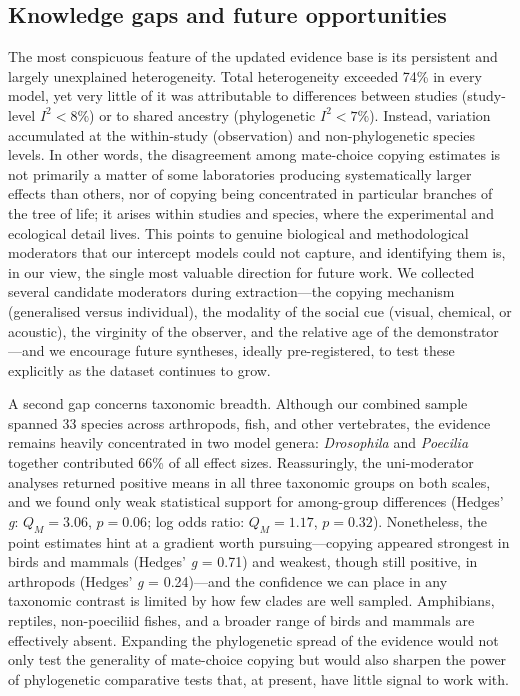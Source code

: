 \subsection{Knowledge gaps and future opportunities}

The most conspicuous feature of the updated evidence base is its persistent and
largely unexplained heterogeneity. Total heterogeneity exceeded 74\% in every
model, yet very little of it was attributable to differences between studies
(study-level $I^2 < 8\%$) or to shared ancestry (phylogenetic $I^2 < 7\%$).
Instead, variation accumulated at the within-study (observation) and
non-phylogenetic species levels. In other words, the disagreement among
mate-choice copying estimates is not primarily a matter of some laboratories
producing systematically larger effects than others, nor of copying being
concentrated in particular branches of the tree of life; it arises within
studies and species, where the experimental and ecological detail lives. This
points to genuine biological and methodological moderators that our intercept
models could not capture, and identifying them is, in our view, the single most
valuable direction for future work. We collected several candidate moderators
during extraction---the copying mechanism (generalised versus individual), the
modality of the social cue (visual, chemical, or acoustic), the virginity of the
observer, and the relative age of the demonstrator---and we encourage future
syntheses, ideally pre-registered, to test these explicitly as the dataset
continues to grow.

A second gap concerns taxonomic breadth. Although our combined sample spanned 33
species across arthropods, fish, and other vertebrates, the evidence remains
heavily concentrated in two model genera: \textit{Drosophila} and
\textit{Poecilia} together contributed 66\% of all effect sizes. Reassuringly,
the uni-moderator analyses returned positive means in all three taxonomic groups
on both scales, and we found only weak statistical support for among-group
differences (Hedges' \textit{g}: $Q_M = 3.06$, $p = 0.06$; log odds ratio:
$Q_M = 1.17$, $p = 0.32$). Nonetheless, the point estimates hint at a gradient
worth pursuing---copying appeared strongest in birds and mammals
(Hedges' \textit{g} = 0.71) and weakest, though still positive, in arthropods
(Hedges' \textit{g} = 0.24)---and the confidence we can place in any taxonomic
contrast is limited by how few clades are well sampled. Amphibians, reptiles,
non-poeciliid fishes, and a broader range of birds and mammals are effectively
absent. Expanding the phylogenetic spread of the evidence would not only test
the generality of mate-choice copying but would also sharpen the power of
phylogenetic comparative tests that, at present, have little signal to work
with.

